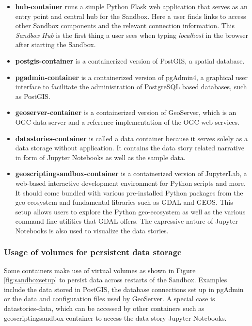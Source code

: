 \documentclass[11pt, a4paper, oneside, parskip=full-]{scrartcl}
\begin{document}
\begin{itemize}
  \item \textbf{hub-container} runs a simple Python Flask\cite{flask} web
  application that serves as an entry point and central hub for the Sandbox.
  Here a user finds links to access other Sandbox components and the relevant
  connection information. This \emph{Sandbox Hub} is the first thing a user sees
  when typing \emph{localhost} in the browser after starting the Sandbox.
  \item \textbf{postgis-container} is a containerized version of PostGIS, a
  spatial database.
  \item \textbf{pgadmin-container} is a containerized version of pgAdmin4, a
  graphical user interface to facilitate the administration of PostgreSQL based
  databases, such as PostGIS.
  \item \textbf{geoserver-container} is a containerized version of GeoServer,
  which is an OGC data server and a reference implementation of the OGC web
  services.
  \item \textbf{datastories-container} is called a data container because it
  serves solely as a data storage without application. It contains the data
  story related narrative in form of Jupyter Notebooks as well as the sample
  data.
  \item \textbf{geoscriptingsandbox-container} is a containerized version of
  JupyterLab, a web-based interactive development environment for Python scripts
  and more. It should come bundled with various pre-installed Python packages
  from the geo-ecosystem and fundamental libraries such as GDAL and
  GEOS\cite{geos}. This setup allows users to explore the Python geo-ecosystem
  as well as the various command line utilities that GDAL offers. The expressive
  nature of Jupyter Notebooks is also used to visualize the data stories.
\end{itemize}

\subsubsection*{Usage of volumes for persistent data storage}
Some containers make use of virtual volumes as shown in Figure
\ref{fig:sandboxsetup} to persist data across restarts of the Sandbox. Examples
include the data stored in PostGIS, the database connections set up in pgAdmin
or the data and configuration files used by GeoServer. A special case is
datastories-data, which can be accessed by other containers such as
geoscriptingsandbox-container to access the data story Jupyter Notebooks.
\end{document}
